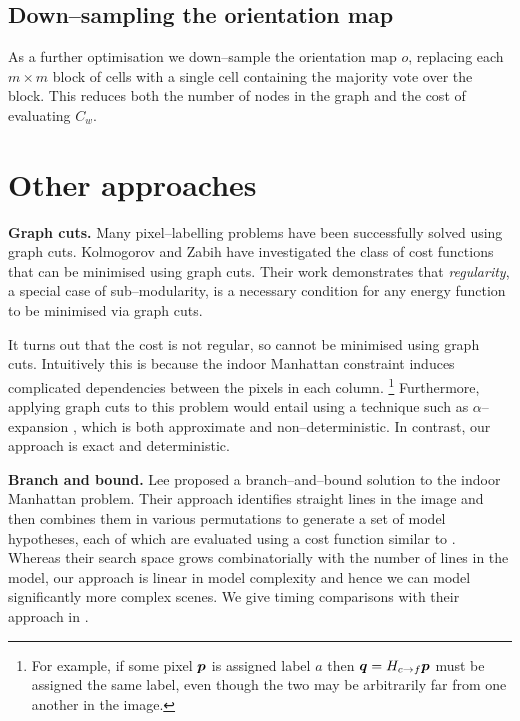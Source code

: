 \subsection{Down--sampling the orientation map}

As a further optimisation we down--sample the orientation map $o$,
replacing each $m \times m$ block of cells with a single cell
containing the majority vote over the block. This reduces both the
number of nodes in the graph and the cost of evaluating $C_w$.

\section{Other approaches}

\textbf{Graph cuts. }
\label{sect:comp-graph-cuts}
Many pixel--labelling problems have been successfully solved using
graph cuts. Kolmogorov and Zabih \cite{Kolmogorov02} have investigated
the class of cost functions that can be minimised using graph cuts.
Their work demonstrates that \textit{regularity}, a special case of
sub--modularity, is a necessary condition for any energy function to be
minimised via graph cuts.

It turns out that the cost  is not regular, so cannot be
minimised using graph cuts. Intuitively this is because the indoor
Manhattan constraint induces complicated dependencies between the
pixels in each column. \footnote{For example, if some pixel $\boldsymbol{p}$
  is assigned label $a$ then $\boldsymbol{q}=H_{c \rightarrow f}\boldsymbol{p}$ must be assigned
  the same label, even though the two may be arbitrarily far from one
  another in the image.} Furthermore, applying graph cuts to this
problem would entail using a technique such as $\alpha$--expansion
\cite{Kolmogorov02}, which is both approximate and
non--deterministic. In contrast, our approach is exact and
deterministic.

\textbf{Branch and bound.}
Lee \etal \cite{Lee09} proposed a branch--and--bound solution to the
indoor Manhattan problem. Their approach identifies straight lines in
the image and then combines them in various permutations to generate a
set of model hypotheses, each of which are evaluated using a cost
function similar to . Whereas their search space grows
combinatorially with the number of lines in the model, our approach is
linear in model complexity and hence we can model significantly more
complex scenes. We give timing comparisons with their approach in
.

